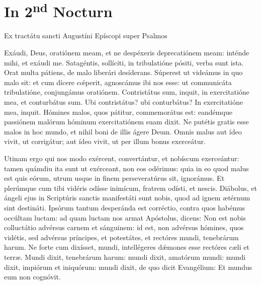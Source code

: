 \section*{In 2\textsuperscript{nd} Nocturn}


    




    Ex tractátu sancti Augustíni Epíscopi super Psalmos


    Exáudi, Deus, oratiónem meam, et ne despéxeris deprecatiónem meam: inténde
    mihi, et exáudi me. Satagéntis, sollíciti, in tribulatióne pósiti, verba
    sunt ista. Orat multa pátiens, de malo liberári desíderans. Súperest ut
    videámus in quo malo sit: et cum dícere cœ́perit, agnoscámus ibi nos esse:
    ut communicáta tribulatióne, conjungámus oratiónem. Contristátus sum,
    inquit, in exercitatióne mea, et conturbátus sum. Ubi contristátus? ubi
    conturbátus? In exercitatióne mea, inquit. Hómines malos, quos pátitur,
    commemorátus est: eandémque passiónem malórum hóminum exercitatiónem suam
    dixit. Ne putétis gratis esse malos in hoc mundo, et nihil boni de illis
    ágere Deum. Omnis malus aut ídeo vivit, ut corrigátur; aut ídeo vivit, ut
    per illum bonus exerceátur.



    Utinam ergo qui nos modo exércent, convertántur, et nobíscum exerceántur:
    tamen quámdiu ita sunt ut exérceant, non eos odérimus: quia in eo quod
    malus est quis eórum, utrum usque in finem perseveratúrus sit, ignorámus.
    Et plerúmque cum tibi vidéris odísse inimícum, fratrem odísti, et nescis.
    Diábolus, et ángeli ejus in Scriptúris sanctis manifestáti sunt nobis, quod
    ad ignem ætérnum sint destináti. Ipsórum tantum desperánda est corréctio,
    contra quos habémus occúltam luctam: ad quam luctam nos armat Apóstolus,
    dicens: Non est nobis colluctátio advérsus carnem et sánguinem: id est, non
    advérsus hómines, quos vidétis, sed advérsus príncipes, et potestátes, et
    rectóres mundi, tenebrárum harum. Ne forte cum dixísset, mundi,
    intellégeres dǽmones esse rectóres cæli et terræ. Mundi dixit, tenebrárum
    harum: mundi dixit, amatórum mundi: mundi dixit, impiórum et iniquórum:
    mundi dixit, de quo dicit Evangélium: Et mundus eum non cognóvit.

